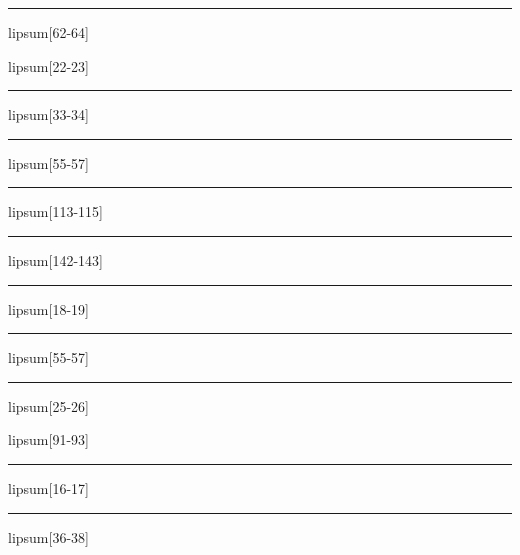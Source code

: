 \documentclass[11pt,a4paper]{article}
\begin{document}
\begin{simplewrap}
  \textcolor{orange!33}{\rule{5.6cm}{8.7cm}}
\end{simplewrap}
lipsum[62-64]

lipsum[22-23]

\begin{simplewrap}
  \textcolor{red!14}{\rule{5.9cm}{6.3cm}}
\end{simplewrap}
lipsum[33-34]

\begin{simplewrap}
  \textcolor{magenta!20}{\rule{3.8cm}{9.0cm}}
\end{simplewrap}
lipsum[55-57]

\begin{simplewrap}
  \textcolor{yellow!55}{\rule{3.9cm}{10.0cm}}
\end{simplewrap}
lipsum[113-115]

\begin{simplewrap}
  \textcolor{blue!17}{\rule{3.7cm}{2.5cm}}
\end{simplewrap}
lipsum[142-143]

\begin{simplewrap}
  \textcolor{magenta!10}{\rule{3.2cm}{7.0cm}}
\end{simplewrap}
lipsum[18-19]

\begin{simplewrap}
  \textcolor{brown!14}{\rule{4.5cm}{4.2cm}}
\end{simplewrap}
lipsum[55-57]

\begin{simplewrap}
  \textcolor{red!25}{\rule{5.4cm}{8.5cm}}
\end{simplewrap}
lipsum[25-26]

lipsum[91-93]

\begin{simplewrap}
  \textcolor{olive!36}{\rule{4.4cm}{7.8cm}}
\end{simplewrap}
lipsum[16-17]

\begin{simplewrap}
  \textcolor{brown!16}{\rule{3.7cm}{3.5cm}}
\end{simplewrap}
lipsum[36-38]
\end{document}
